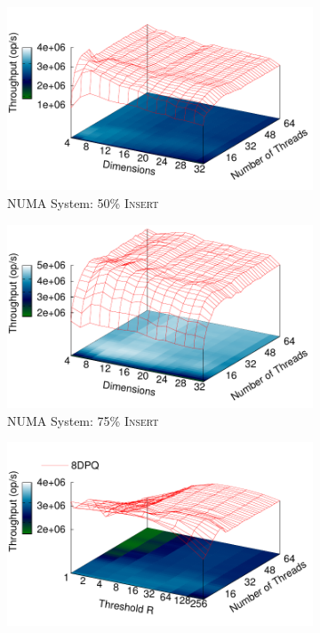 \documentclass[10pt,journal,letter,compsoc]{IEEEtran}
\begin{document}
\begin{figure}[t]
    \begin{subfigure}{0.33\textwidth}
        \centering
        \includegraphics[width=1\columnwidth]{./data/amdsweep50insert.pdf}
        \caption{NUMA System: 50\% \textsc{Insert}}
        \label{fig:dimsweep50}
    \end{subfigure}
    \hfill
    \begin{subfigure}{0.33\textwidth}
        \centering
        \includegraphics[width=1\columnwidth]{./data/amdsweep75insert.pdf}
        \caption{NUMA System: 75\% \textsc{Insert}}
        \label{fig:dimsweep75}
    \end{subfigure}
    \hfill
    \begin{subfigure}{0.33\textwidth}
        \centering
        \includegraphics[width=1\columnwidth]{./data/amdsweepprg50insert.pdf}

\end{subfigure}
\end{figure}
\end{document}
